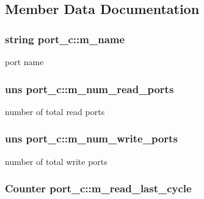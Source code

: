 \subsection{Member Data Documentation}
\hypertarget{classport__c_a2b44eaf0273caec8c39cce0a415c3374}{
\subsubsection[{m\_\-name}]{\setlength{\rightskip}{0pt plus 5cm}string {\bf port\_\-c::m\_\-name}}}
\label{classport__c_a2b44eaf0273caec8c39cce0a415c3374}
port name \hypertarget{classport__c_abd7a8bdfe7fb296394ef5069f99cf7b1}{
\subsubsection[{m\_\-num\_\-read\_\-ports}]{\setlength{\rightskip}{0pt plus 5cm}uns {\bf port\_\-c::m\_\-num\_\-read\_\-ports}}}
\label{classport__c_abd7a8bdfe7fb296394ef5069f99cf7b1}
number of total read ports \hypertarget{classport__c_a11d136595f0237804f421c7ab5318789}{
\subsubsection[{m\_\-num\_\-write\_\-ports}]{\setlength{\rightskip}{0pt plus 5cm}uns {\bf port\_\-c::m\_\-num\_\-write\_\-ports}}}
\label{classport__c_a11d136595f0237804f421c7ab5318789}
number of total write ports \hypertarget{classport__c_acd222eb5127ef8d6766f47c8de56ccf3}{
\subsubsection[{m\_\-read\_\-last\_\-cycle}]{\setlength{\rightskip}{0pt plus 5cm}Counter {\bf port\_\-c::m\_\-read\_\-last\_\-cycle}}}
